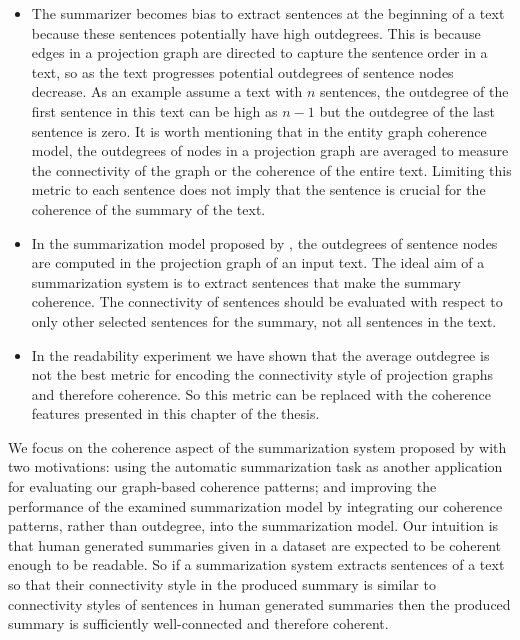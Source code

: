 \begin{itemize}
	\item 
	The summarizer becomes bias to extract sentences at the beginning of a text because these sentences potentially have high outdegrees. 
	This is because edges in a projection graph are directed to capture the sentence order in a text, so as the text progresses potential outdegrees of sentence nodes decrease. 
	As an example assume a text with $n$ sentences, the outdegree of the first sentence in this text can be high as $n-1$ but the outdegree of the last sentence is zero. 
	It is worth mentioning that in the entity graph coherence model, the outdegrees of nodes in a projection graph are averaged to measure the connectivity of the graph or the coherence of the entire text.  
	Limiting this metric to each sentence does not imply that the sentence is crucial for the coherence of the summary of the text.   
	
	\item 
	In the summarization model proposed by , the outdegrees of sentence nodes are computed in the projection graph of an input text.   
	The ideal aim of a summarization system is to extract sentences that make the summary coherence. 
	The connectivity of sentences should be evaluated with respect to only other selected sentences for the summary, not all sentences in the text. 


	\item In the readability experiment we have shown that the average outdegree is not the best metric for encoding the connectivity style of projection graphs and therefore coherence. 
	So this metric can be replaced with the coherence features presented in this chapter of the thesis. 

\end{itemize} 

We focus on the coherence aspect of the summarization system proposed by  with two motivations: using the automatic summarization task as another application for evaluating our graph-based coherence patterns; and improving the performance of the examined summarization  model by integrating our coherence patterns, rather than outdegree, into the summarization model. 
Our intuition is that human generated summaries given in a dataset are expected to be coherent enough to be readable.
So if a summarization system extracts sentences of a text so that their connectivity style in the produced summary is similar to connectivity styles of sentences in human generated summaries then the produced summary is sufficiently well-connected and therefore coherent. 
 
